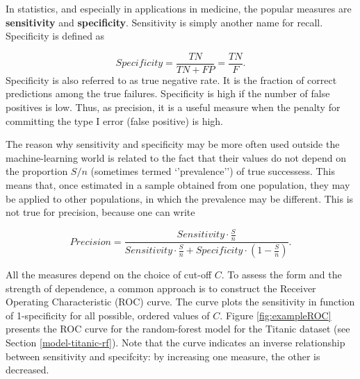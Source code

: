 \documentclass[12pt,]{krantz}
\begin{document}
In statistics, and especially in applications in medicine, the popular measures are \textbf{sensitivity} and \textbf{specificity}. Sensitivity is simply another name for recall. Specificity is defined as

\[
Specificity = \frac{TN}{TN + FP} = \frac{TN}{F}.
\]
Specificity is also referred to as true negative rate. It is the fraction of correct predictions among the true failures. Specificity is high if the number of false positives is low. Thus, as precision, it is a useful measure when the penalty for committing the type I error (false positive) is high.

The reason why sensitivity and specificity may be more often used outside the machine-learning world is related to the fact that their values do not depend on the proportion \(S/n\) (sometimes termed `'prevalence'') of true successess. This means that, once estimated in a sample obtained from one population, they may be applied to other populations, in which the prevalence may be different. This is not true for precision, because one can write

\[
Precision = \frac{Sensitivity \cdot \frac{S}{n}}{Sensitivity \cdot \frac{S}{n}+Specificity \cdot \left(1-\frac{S}{n}\right)}.
\]

All the measures depend on the choice of cut-off \(C\). To assess the form and the strength of dependence, a common approach is to construct the Receiver Operating Characteristic (ROC) curve. The curve plots the sensitivity in function of 1-specificity for all possible, ordered values of \(C\). Figure \ref{fig:exampleROC} presents the ROC curve for the random-forest model for the Titanic dataset (see Section \ref{model-titanic-rf}). Note that the curve indicates an inverse relationship between sensitivity and specifcity: by increasing one measure, the other is decreased.
\end{document}
